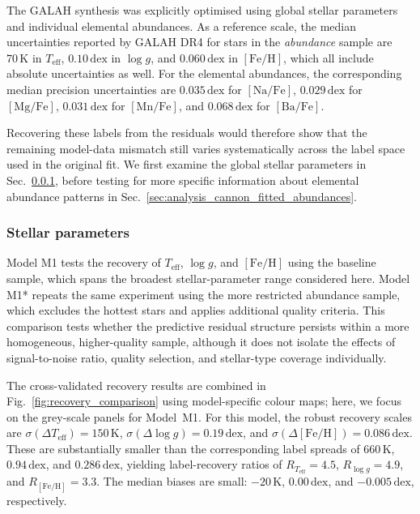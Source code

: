 \documentclass[twocolumn,apj,numberedappendix,appendixfloats]{openjournal}
\begin{document}
The GALAH synthesis was explicitly optimised using global stellar parameters and individual elemental abundances. As a reference scale, the median uncertainties reported by GALAH DR4 for stars in the \textit{abundance} sample are $70\,\mathrm{K}$ in $T_\mathrm{eff}$, $0.10\,\mathrm{dex}$ in $\log g$, and $0.060\,\mathrm{dex}$ in $[\mathrm{Fe/H}]$, which all include absolute uncertainties as well. For the elemental abundances, the corresponding median precision uncertainties are $0.035\,\mathrm{dex}$ for $[\mathrm{Na/Fe}]$, $0.029\,\mathrm{dex}$ for $[\mathrm{Mg/Fe}]$, $0.031\,\mathrm{dex}$ for $[\mathrm{Mn/Fe}]$, and $0.068\,\mathrm{dex}$ for $[\mathrm{Ba/Fe}]$.

Recovering these labels from the residuals would therefore show that the remaining model-data mismatch still varies systematically across the label space used in the original fit. We first examine the global stellar parameters in Sec.~\ref{sec:analysis_cannon_fitted_stellar_parameters}, before testing for more specific information about elemental abundance patterns in Sec.~\ref{sec:analysis_cannon_fitted_abundances}.

\subsubsection{Stellar parameters}
\label{sec:analysis_cannon_fitted_stellar_parameters}

Model \textcolor{M1}{M1} tests the recovery of $T_\mathrm{eff}$, $\log g$, and $[\mathrm{Fe/H}]$ using the baseline sample, which spans the broadest stellar-parameter range considered here. Model \textcolor{M1}{M1*} repeats the same experiment using the more restricted abundance sample, which excludes the hottest stars and applies additional quality criteria. This comparison tests whether the predictive residual structure persists within a more homogeneous, higher-quality sample, although it does not isolate the effects of signal-to-noise ratio, quality selection, and stellar-type coverage individually.

The cross-validated recovery results are combined in Fig.~\ref{fig:recovery_comparison} using model-specific colour maps; here, we focus on the grey-scale panels for Model~\textcolor{M1}{M1}. For this model, the robust recovery scales are $\sigma(\Delta T_\mathrm{eff})=150\,\mathrm{K}$, $\sigma(\Delta\log g)=0.19\,\mathrm{dex}$, and $\sigma(\Delta[\mathrm{Fe/H}])=0.086\,\mathrm{dex}$. These are substantially smaller than the corresponding label spreads of $660\,\mathrm{K}$, $0.94\,\mathrm{dex}$, and $0.286\,\mathrm{dex}$, yielding label-recovery ratios of $R_{T_\mathrm{eff}}=4.5$, $R_{\log g}=4.9$, and $R_{[\mathrm{Fe/H}]}=3.3$. The median biases are small: $-20\,\mathrm{K}$, $0.00\,\mathrm{dex}$, and $-0.005\,\mathrm{dex}$, respectively.
\end{document}
